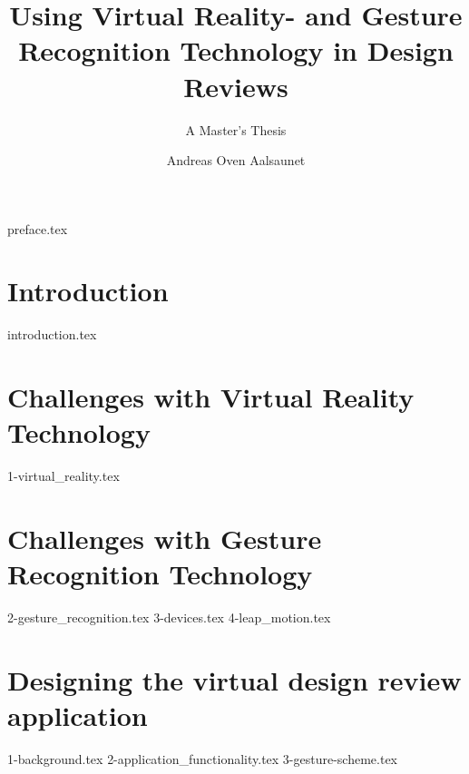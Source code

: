 \documentclass[UKenglish]{ifimaster}
\title{Using Virtual Reality- and Gesture Recognition Technology in Design Reviews}
\subtitle{A Master's Thesis}
\author{Andreas Oven Aalsaunet}
\begin{document}
\duoforside[dept={Department of Informatics}, program={Programming and Networks}, long]                                        

{preface.tex}

\frontmatter{}                 
\tableofcontents{}
\listoffigures{}
\listoftables{}

\mainmatter{}
\chapter{Introduction}  
{introduction.tex}

\chapter{Challenges with Virtual Reality Technology}
{1-virtual_reality.tex}

\chapter{Challenges with Gesture Recognition Technology}
{2-gesture_recognition.tex}
{3-devices.tex}
{4-leap_motion.tex}



\chapter{Designing the virtual design review application}
{1-background.tex}
{2-application_functionality.tex}
{3-gesture-scheme.tex}
\end{document}
